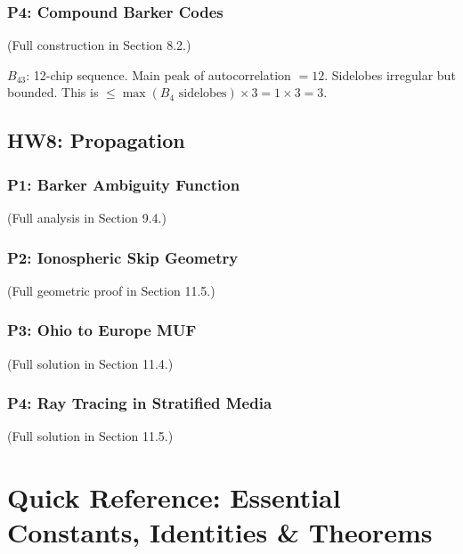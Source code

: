 \documentclass[10pt,letterpaper]{article}
\begin{document}
\subsubsection{P4: Compound Barker Codes}
(Full construction in Section 8.2.)

$B_{43}$: 12-chip sequence. Main peak of autocorrelation $= 12$. Sidelobes irregular but bounded. This is $\leq \max(B_4\text{ sidelobes})\times3 = 1\times3 = 3$.

\subsection{HW8: Propagation}

\subsubsection{P1: Barker Ambiguity Function}
(Full analysis in Section 9.4.)

\subsubsection{P2: Ionospheric Skip Geometry}
(Full geometric proof in Section 11.5.)

\subsubsection{P3: Ohio to Europe MUF}
(Full solution in Section 11.4.)

\subsubsection{P4: Ray Tracing in Stratified Media}
(Full solution in Section 11.5.)

\section{Quick Reference: Essential Constants, Identities \& Theorems}
\end{document}
